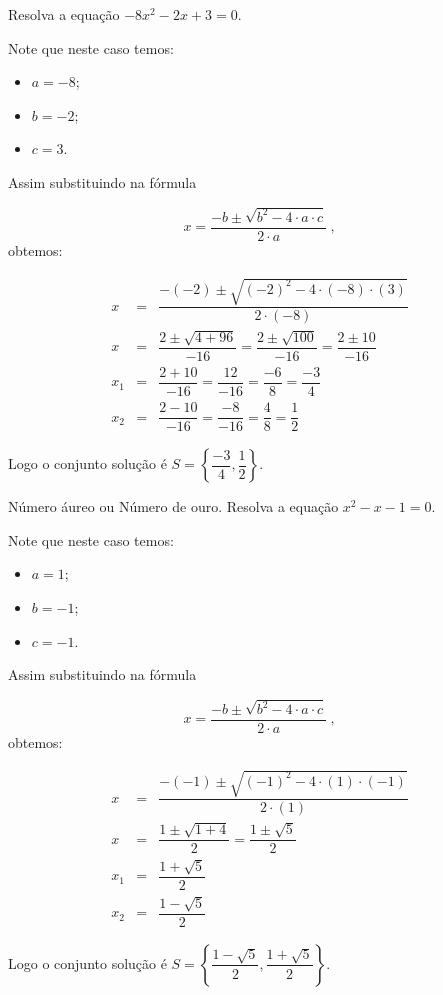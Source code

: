  \begin{exem}
  Resolva a equação $-8x^2 - 2x + 3= 0$.

 Note que neste caso temos:
  \begin{itemize}
  \item $a= -8$;
  \item $b= -2$;
  \item $c= 3$.
  \end{itemize}
  Assim substituindo na fórmula

\begin{equation}
x = \dfrac{-b \pm \sqrt{b^2 - 4 \cdot a \cdot c}}{2 \cdot a} \ ,
\end{equation}
 obtemos:

 \begin{eqnarray*}
 x &=& \dfrac{-(-2) \pm \sqrt{(-2)^2 - 4 \cdot (-8) \cdot (3)}}{2 \cdot (-8)} \\
 x &=& \dfrac{2 \pm \sqrt{4 + 96}}{-16}= \dfrac{2 \pm \sqrt{100}}{-16}= \dfrac{2 \pm 10}{-16} \\
 x_1 &=& \dfrac{2 + 10}{-16}= \dfrac{12}{-16}= \dfrac{-6}{8}= \dfrac{-3}{4} \\
 x_2 &=& \dfrac{2 - 10}{-16}= \dfrac{-8}{-16}= \dfrac{4}{8}= \dfrac{1}{2}
 \end{eqnarray*}

 Logo o conjunto solução é $S= \left\{ \dfrac{-3}{4}, \dfrac{1}{2} \right\}$.
\end{exem}
 
 \begin{exem}
  Número áureo ou Número de ouro. Resolva a equação $x^2 - x - 1= 0$.

 Note que neste caso temos:
  \begin{itemize}
  \item $a= 1$;
  \item $b= -1$;
  \item $c= -1$.
  \end{itemize}
  Assim substituindo na fórmula

\begin{equation}
x = \dfrac{-b \pm \sqrt{b^2 - 4 \cdot a \cdot c}}{2 \cdot a} \ ,
\end{equation}
 obtemos:

 \begin{eqnarray*}
 x &=& \dfrac{-(-1) \pm \sqrt{(-1)^2 - 4 \cdot (1) \cdot (-1)}}{2 \cdot (1)} \\
 x &=& \dfrac{1 \pm \sqrt{1 + 4}}{2}= \dfrac{1 \pm \sqrt{5}}{2} \\
 x_1 &=& \dfrac{1 + \sqrt{5}}{2} \\
 x_2 &=& \dfrac{1 - \sqrt{5}}{2}
 \end{eqnarray*}

 Logo o conjunto solução é $S= \left\{ \dfrac{1 - \sqrt{5}}{2}, \dfrac{1 + \sqrt{5}}{2} \right\}$.
 \end{exem}
 
